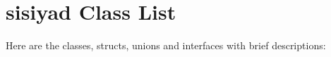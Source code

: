 \section{sisiyad Class List}
Here are the classes, structs, unions and interfaces with brief descriptions:\begin{CompactList}
\item{}
\end{CompactList}
